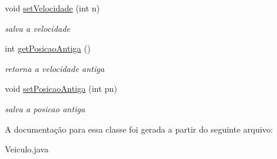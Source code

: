 \begin{DoxyCompactItemize}
void \mbox{\hyperlink{classcom_1_1company_1_1_veiculo_a1e5cd5adf67832f217eb08b500a4a272}{set\+Velocidade}} (int n)
\begin{DoxyCompactList}\small\item\em salva a velocidade \end{DoxyCompactList}\item 
\mbox{\label{classcom_1_1company_1_1_veiculo_ac5031ed15eb034d06b31887f0965d690}} 
int \mbox{\hyperlink{classcom_1_1company_1_1_veiculo_ac5031ed15eb034d06b31887f0965d690}{get\+Posicao\+Antiga}} ()
\begin{DoxyCompactList}\small\item\em retorna a velocidade antiga \end{DoxyCompactList}\item 
\mbox{\label{classcom_1_1company_1_1_veiculo_a01b02131f3f6956622443c9ae7e47e6e}} 
void \mbox{\hyperlink{classcom_1_1company_1_1_veiculo_a01b02131f3f6956622443c9ae7e47e6e}{set\+Posicao\+Antiga}} (int pn)
\begin{DoxyCompactList}\small\item\em salva a posicao antiga \end{DoxyCompactList}\end{DoxyCompactItemize}


A documentação para essa classe foi gerada a partir do seguinte arquivo\+:\begin{DoxyCompactItemize}
\item 
Veiculo.\+java\end{DoxyCompactItemize}
